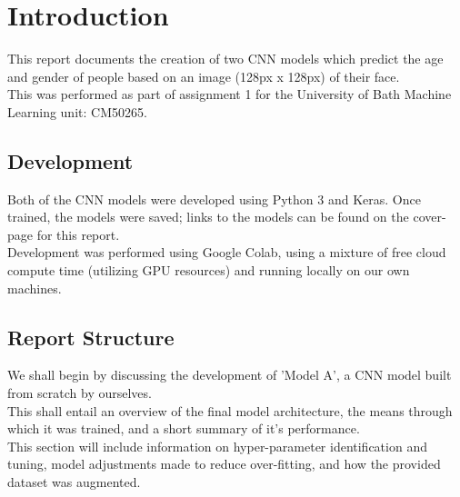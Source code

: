 





\section{Introduction}
This report documents the creation of two CNN models which predict the age and gender of people based on an image (128px x 128px) of their face.\\
This was performed as part of assignment 1 for the University of Bath Machine Learning unit: CM50265.

\begin{optional}
    \subsection{Development}
    Both of the CNN models were developed using Python 3 and Keras. Once trained, the models were saved; links to the models can be found on the cover-page for this report.\\
    Development was performed using Google Colab, using a mixture of free cloud compute time (utilizing GPU resources) and running locally on our own machines. 
\end{optional}
    
    \subsection{Report Structure}
We shall begin by discussing the development of 'Model A', a CNN model built from scratch by ourselves.\\
This shall entail an overview of the final model architecture, the means through which it was trained, and a short summary of it's performance.\\
This section will include information on hyper-parameter identification and tuning, model adjustments made to reduce over-fitting, and how the provided dataset was augmented.\\

